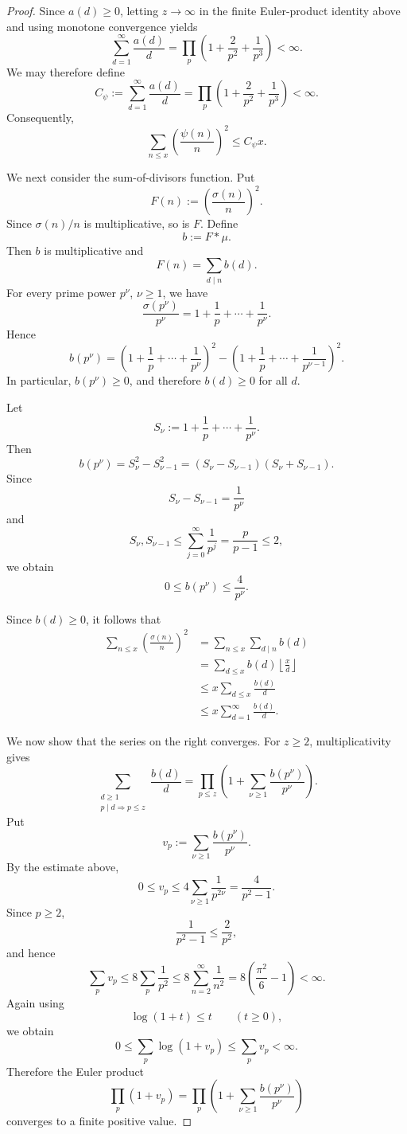 \documentclass{article}
\theoremstyle{remark}
\begin{document}
\begin{proof}
Since \(a(d)\geq0\), letting \(z\to\infty\) in the finite Euler-product
identity above and using monotone convergence yields
\[
\sum_{d=1}^{\infty}\frac{a(d)}{d}
=
\prod_p
\left(1+\frac2{p^2}+\frac1{p^3}\right)
<\infty.
\]
We may therefore define
\[
C_\psi
:=
\sum_{d=1}^{\infty}\frac{a(d)}{d}
=
\prod_p
\left(1+\frac2{p^2}+\frac1{p^3}\right)
<\infty.
\]
Consequently,
\[
\sum_{n\leq x}
\left(\frac{\psi(n)}{n}\right)^2
\leq C_\psi x.
\]

We next consider the sum-of-divisors function. Put
\[
F(n):=\left(\frac{\sigma(n)}{n}\right)^2.
\]
Since \(\sigma(n)/n\) is multiplicative, so is \(F\). Define
\[
b:=F*\mu.
\]
Then \(b\) is multiplicative and
\[
F(n)=\sum_{d\mid n}b(d).
\]
For every prime power \(p^\nu\), \(\nu\geq1\), we have
\[
\frac{\sigma(p^\nu)}{p^\nu}
=
1+\frac1p+\cdots+\frac1{p^\nu}.
\]
Hence
\[
b(p^\nu)
=
\left(1+\frac1p+\cdots+\frac1{p^\nu}\right)^2
-
\left(1+\frac1p+\cdots+\frac1{p^{\nu-1}}\right)^2.
\]
In particular, \(b(p^\nu)\geq0\), and therefore \(b(d)\geq0\) for all \(d\).

Let
\[
S_\nu:=1+\frac1p+\cdots+\frac1{p^\nu}.
\]
Then
\[
b(p^\nu)
=
S_\nu^2-S_{\nu-1}^2
=
(S_\nu-S_{\nu-1})(S_\nu+S_{\nu-1}).
\]
Since
\[
S_\nu-S_{\nu-1}=\frac1{p^\nu}
\]
and
\[
S_\nu,S_{\nu-1}
\leq
\sum_{j=0}^{\infty}\frac1{p^j}
=
\frac{p}{p-1}
\leq2,
\]
we obtain
\[
0\leq b(p^\nu)\leq\frac4{p^\nu}.
\]

Since \(b(d)\geq0\), it follows that
\[
\begin{aligned}
\sum_{n\leq x}\left(\frac{\sigma(n)}{n}\right)^2
&=
\sum_{n\leq x}\sum_{d\mid n}b(d)\\
&=
\sum_{d\leq x}b(d)
\left\lfloor\frac{x}{d}\right\rfloor\\
&\leq
x\sum_{d\leq x}\frac{b(d)}{d}\\
&\leq
x\sum_{d=1}^{\infty}\frac{b(d)}{d}.
\end{aligned}
\]

We now show that the series on the right converges. For \(z\geq2\),
multiplicativity gives
\[
\sum_{\substack{d\geq1\\ p\mid d\Rightarrow p\leq z}}
\frac{b(d)}{d}
=
\prod_{p\leq z}
\left(
1+\sum_{\nu\geq1}\frac{b(p^\nu)}{p^\nu}
\right).
\]
Put
\[
v_p:=
\sum_{\nu\geq1}\frac{b(p^\nu)}{p^\nu}.
\]
By the estimate above,
\[
0\leq v_p
\leq
4\sum_{\nu\geq1}\frac1{p^{2\nu}}
=
\frac4{p^2-1}.
\]
Since \(p\geq2\),
\[
\frac1{p^2-1}\leq\frac2{p^2},
\]
and hence
\[
\sum_pv_p
\leq
8\sum_p\frac1{p^2}
\leq
8\sum_{n=2}^{\infty}\frac1{n^2}
=
8\left(\frac{\pi^2}{6}-1\right)
<
\infty.
\]
Again using
\[
\log(1+t)\leq t
\qquad(t\geq0),
\]
we obtain
\[
0\leq
\sum_p\log(1+v_p)
\leq
\sum_pv_p
<
\infty.
\]
Therefore the Euler product
\[
\prod_p(1+v_p)
=
\prod_p
\left(
1+\sum_{\nu\geq1}\frac{b(p^\nu)}{p^\nu}
\right)
\]
converges to a finite positive value.


\end{proof}
\end{document}
